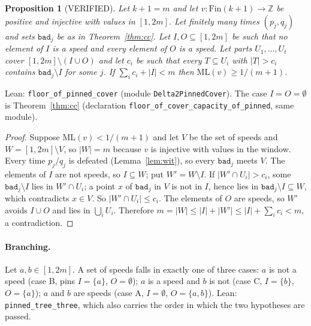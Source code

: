 \documentclass[11pt]{article}
\newtheorem{proposition}[theorem]{Proposition}
\theoremstyle{remark}
\newcommand{\ML}{\mathrm{ML}}
\newcommand{\Z}{\mathbb{Z}}
\begin{document}
\begin{proposition}[VERIFIED]\label{prop:pinned}
Let $k+1=m$ and let $v:\mathrm{Fin}(k+1)\to\Z$ be positive and injective with values in $[1,2m]$. Let finitely many times $(p_j,q_j)$ and sets $\mathtt{bad}_j$ be as in Theorem~\ref{thm:cc}. Let $I,O\subseteq[1,2m]$ be such that no element of $I$ is a speed and every element of $O$ is a speed. Let parts $U_1,\dots,U_t$ cover $[1,2m]\setminus(I\cup O)$ and let $c_i$ be such that every $T\subseteq U_i$ with $|T|>c_i$ contains $\mathtt{bad}_j\setminus I$ for some $j$. If $\sum_ic_i+|I|<m$ then $\ML(v)\ge1/(m+1)$.
\end{proposition}
\noindent Lean: \texttt{floor\_of\_pinned\_cover} (module \texttt{Delta2PinnedCover}). The case $I=O=\emptyset$ is Theorem~\ref{thm:cc} (declaration \texttt{floor\_of\_cover\_capacity\_of\_pinned}, same module).
\begin{proof}
Suppose $\ML(v)<1/(m+1)$ and let $V$ be the set of speeds and $W=[1,2m]\setminus V$, so $|W|=m$ because $v$ is injective with values in the window. Every time $p_j/q_j$ is defeated (Lemma~\ref{lem:wit}), so every $\mathtt{bad}_j$ meets $V$. The elements of $I$ are not speeds, so $I\subseteq W$; put $W'=W\setminus I$. If $|W'\cap U_i|>c_i$, some $\mathtt{bad}_j\setminus I$ lies in $W'\cap U_i$; a point $x$ of $\mathtt{bad}_j$ in $V$ is not in $I$, hence lies in $\mathtt{bad}_j\setminus I\subseteq W$, which contradicts $x\in V$. So $|W'\cap U_i|\le c_i$. The elements of $O$ are speeds, so $W'$ avoids $I\cup O$ and lies in $\bigcup_iU_i$. Therefore $m=|W|\le|I|+|W'|\le|I|+\sum_ic_i<m$, a contradiction.
\end{proof}

\paragraph{Branching.} Let $a,b\in[1,2m]$. A set of speeds falls in exactly one of three cases: $a$ is not a speed (case B, pins $I=\{a\}$, $O=\emptyset$); $a$ is a speed and $b$ is not (case C, $I=\{b\}$, $O=\{a\}$); $a$ and $b$ are speeds (case A, $I=\emptyset$, $O=\{a,b\}$). Lean: \texttt{pinned\_tree\_three}, which also carries the order in which the two hypotheses are passed.
\end{document}

